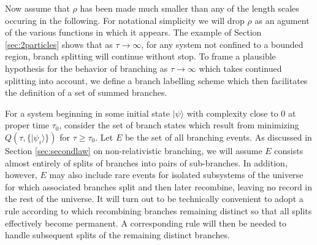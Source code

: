 \documentclass[12pt,amsmath,amssymb,onecolumn]{revtex4-2}
\begin{document}
Now assume that
$\rho$ has been made much smaller than any of the
length scales occuring in the following.
For notational simplicity we will drop $\rho$ as an agument
of the various functions in which it appears.
The example of Section \ref{sec:2particles}
shows that as $\tau \rightarrow \infty$, for any system
not confined to a bounded region, branch splitting
will continue without stop.
To frame a plausible hypothesis for
the behavior of branching as $\tau \rightarrow \infty$
which takes continued splitting into account,
we define a  
branch labelling scheme
which then
facilitates the definition
of a set of summed
branches.

For a system beginning in some initial state $|\psi \rangle $ with
complexity close to 0 at
proper time $\tau_0$, 
consider the set of branch states
which result
from minimizing $Q(\tau, \{|\psi_i \rangle \})$ for $\tau \ge \tau_0$.
Let $E$ be the set of all branching events.
As discussed in Section \ref{sec:secondlaw} on non-relativistic branching,
we will assume $E$ consists almost entirely of splits of branches into
pairs of sub-branches.
In addition, however,
$E$ may also include rare events
for isolated subsystems of the universe for which
associated branches split and then later recombine,
leaving no record in the rest of the universe.
It will turn out to be technically convenient to adopt a rule
according to which
recombining branches
remaining distinct
so that all splits effectively
become permanent. A
corresponding rule will then be needed to handle
subsequent splits of the remaining distinct branches.
\end{document}
